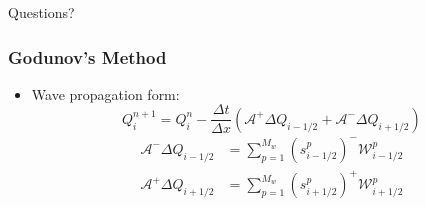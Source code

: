 \documentclass[handout]{beamer}
\begin{document}
\begin{frame}
  \begin{center}
    \LARGE Questions?
  \end{center}
\end{frame}

\begin{frame}
  \frametitle{Godunov's Method}
  \begin{itemize}
    \item Wave propagation form:
      \begin{equation}
        Q_i^{n+1} = Q_i^n - \frac{\Delta t}{\Delta x} (\mathcal{A}^+ \Delta Q_{i-1/2} + \mathcal{A}^- \Delta Q_{i+1/2})
      \end{equation}
      \begin{align}
        \mathcal{A}^- \Delta Q_{i-1/2} &= \sum_{p=1}^{M_w} (s_{i-1/2}^p)^-\mathcal{W}_{i-1/2}^p \\
        \mathcal{A}^+ \Delta Q_{i+1/2} &= \sum_{p=1}^{M_w} (s_{i+1/2}^p)^+\mathcal{W}_{i+1/2}^p
      \end{align}
  \end{itemize}
\end{frame}



\end{document}

